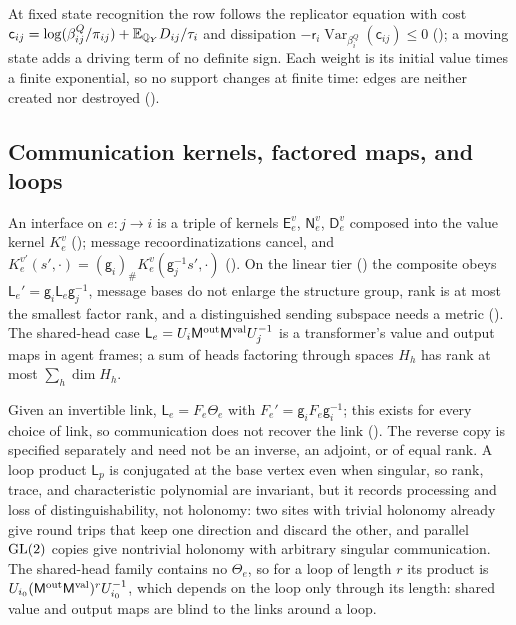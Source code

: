 At fixed state recognition the row follows the replicator equation with cost
$\mathsf c_{ij}=\log(\beta^Q_{ij}/\pi_{ij})+\mathbb E_{\mathbb Q_Y}D_{ij}/\tau_i$ and dissipation
$-\mathsf r_i\operatorname{Var}_{\beta^Q_i}(\mathsf c_{ij})\leq0$ (); a moving state
adds a driving term of no definite sign. Each weight is its initial value times a finite exponential, so no support
changes at finite time: edges are neither created nor destroyed ().

\subsection{Communication kernels, factored maps, and loops}
\label{comp:ch06-communication}

An interface on $e:j\to i$ is a triple of kernels $\mathsf E^v_e$, $\mathsf N^v_e$, $\mathsf D^v_e$ composed into the
value kernel $K^v_e$ (); message recoordinatizations cancel, and
$K^{v\prime}_e(s',\cdot)=(\mathsf g_i)_\#K^v_e(\mathsf g_j^{-1}s',\cdot)$ (). On the
linear tier () the composite obeys $\mathsf L_e'=\mathsf g_i\mathsf L_e\mathsf g_j^{-1}$,
message bases do not enlarge the structure group, rank is at most the smallest factor rank, and a distinguished
sending subspace needs a metric (). The shared-head case
$\mathsf L_e=U_i\mathsf M^{\rm out}\mathsf M^{\rm val}U_j^{-1}$ is a transformer's value and output maps in agent frames;
a sum of heads factoring through spaces $H_h$ has rank at most $\sum_h\dim H_h$.

Given an invertible link, $\mathsf L_e=F_e\Theta_e$ with $F_e'=\mathsf g_iF_e\mathsf g_i^{-1}$; this exists for every choice
of link, so communication does not recover the link (). The reverse copy is specified
separately and need not be an inverse, an adjoint, or of equal rank. A loop product $\mathsf L_p$ is conjugated at the
base vertex even when singular, so rank, trace, and characteristic polynomial are invariant, but it records processing
and loss of distinguishability, not holonomy: two sites with trivial holonomy already give round trips that keep one
direction and discard the other, and parallel $\mathrm{GL}(2)$ copies give nontrivial holonomy with arbitrary singular
communication. The shared-head family contains no $\Theta_e$, so for a loop of length $r$ its product is
$U_{i_0}(\mathsf M^{\rm out}\mathsf M^{\rm val})^rU_{i_0}^{-1}$, which depends on the loop only through its length: shared
value and output maps are blind to the links around a loop.

